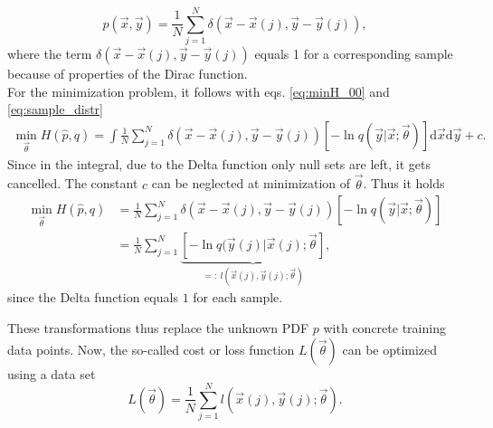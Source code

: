 \begin{equation}
    \hat{p}(\vec{x},\vec{y}) = \frac{1}{N} \sum_{j=1}^N \delta(\vec{x}-\vec{x}(j),\vec{y}-\vec{y}(j)),
    \label{eq:sample_distr}
\end{equation}
where the term $\delta(\vec{x}-\vec{x}(j),\vec{y}-\vec{y}(j))$ equals 1 for a corresponding sample because of properties of the Dirac function.
\\
For the minimization problem, it follows with eqs. \ref{eq:minH_00} and \ref{eq:sample_distr}
\begin{align}
    \min_{\vec{\theta}} H(\hat{p},q) = \int \frac{1}{N} \sum_{j=1}^N \delta(\vec{x}-\vec{x}(j),\vec{y}-\vec{y}(j))[-\ln{q(\vec{y}|\vec{x};\vec{\theta})}]\mathrm{d}\vec{x}\mathrm{d}\vec{y} + c.
\end{align}
Since in the integral, due to the Delta function only null sets are left, it gets cancelled. The constant $c$ can be neglected at minimization of $\vec{\theta}$. Thus it holds
\begin{align}
    \min_{\vec{\theta}} H(\hat{p},q) &= \frac{1}{N} \sum_{j=1}^N \delta(\vec{x}-\vec{x}(j),\vec{y}-\vec{y}(j))[-\ln{q(\vec{y}|\vec{x};\vec{\theta})}] \nonumber\\
    &= \frac{1}{N} \sum_{j=1}^N \underbrace{[-\ln{q(\vec{y}(j)|\vec{x}(j);\vec{\theta}}]}_{=:\:  l(\vec{x}(j),\vec{y}(j);\vec{\theta})},
    \label{eq:min_CE_dis}
\end{align}
since the Delta function equals $1$ for each sample.

These transformations thus replace the unknown PDF $p$ with concrete training data points. Now, the so-called cost or loss function $L(\vec{\theta})$ can be optimized using a data set
\begin{equation}
    L(\vec{\theta}) = \frac{1}{N} \sum_{j=1}^N l(\vec{x}(j),\vec{y}(j);\vec{\theta}).
    \label{eq:coss}
\end{equation}

